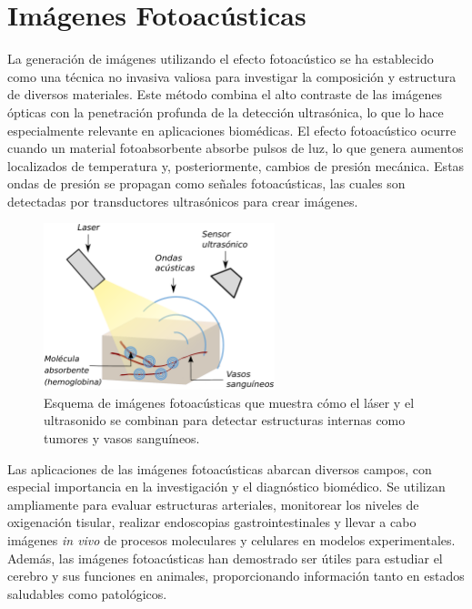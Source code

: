 \section{Imágenes Fotoacústicas} \label{sec:intro}

La generación de imágenes utilizando el efecto fotoacústico se ha establecido como una técnica no invasiva valiosa para investigar la composición y estructura de diversos materiales. Este método combina el alto contraste de las imágenes ópticas con la penetración profunda de la detección ultrasónica, lo que lo hace especialmente relevante en aplicaciones biomédicas. El efecto fotoacústico ocurre cuando un material fotoabsorbente absorbe pulsos de luz, lo que genera aumentos localizados de temperatura y, posteriormente, cambios de presión mecánica. Estas ondas de presión se propagan como señales fotoacústicas, las cuales son detectadas por transductores ultrasónicos para crear imágenes.

\begin{figure}[H]
    \centering
    \includegraphics[width=0.6\textwidth]{Images/effect.pdf} 
    \caption{Esquema de imágenes fotoacústicas que muestra cómo el láser y el ultrasonido se combinan para detectar estructuras internas como tumores y vasos sanguíneos.}
    \label{fig:photoacoustic_scheme}
\end{figure}

Las aplicaciones de las imágenes fotoacústicas abarcan diversos campos, con especial importancia en la investigación y el diagnóstico biomédico. Se utilizan ampliamente para evaluar estructuras arteriales, monitorear los niveles de oxigenación tisular, realizar endoscopias gastrointestinales y llevar a cabo imágenes \textit{in vivo} de procesos moleculares y celulares en modelos experimentales. Además, las imágenes fotoacústicas han demostrado ser útiles para estudiar el cerebro y sus funciones en animales, proporcionando información tanto en estados saludables como patológicos.

